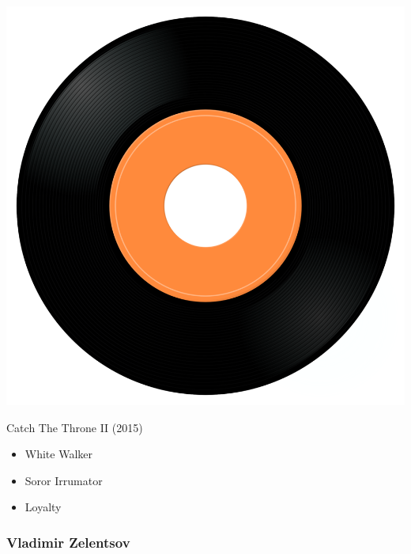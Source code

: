 \begin{minipage}[t]{0.25\textwidth}\vspace{0pt}
\captionsetup{type=figure}
\includegraphics[width=\textwidth]{Images/cover.png}
\caption*{Catch The Throne II (2015)}
\end{minipage}
\begin{minipage}[t]{0.25\textwidth}\vspace{0pt}
\begin{itemize}[nosep,leftmargin=1em,labelwidth=*,align=left]
	\setlength{\itemsep}{0pt}
	\item White Walker
	\item Soror Irrumator
	\item Loyalty
\end{itemize}
\end{minipage}

\subsubsection{Vladimir Zelentsov}

